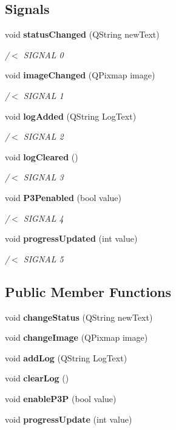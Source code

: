 \subsection*{Signals}
\begin{DoxyCompactItemize}
\item 
void \textbf{ status\+Changed} (Q\+String new\+Text)
\begin{DoxyCompactList}\small\item\em /$<$ S\+I\+G\+N\+AL 0 \end{DoxyCompactList}\item 
void \textbf{ image\+Changed} (Q\+Pixmap image)
\begin{DoxyCompactList}\small\item\em /$<$ S\+I\+G\+N\+AL 1 \end{DoxyCompactList}\item 
void \textbf{ log\+Added} (Q\+String Log\+Text)
\begin{DoxyCompactList}\small\item\em /$<$ S\+I\+G\+N\+AL 2 \end{DoxyCompactList}\item 
void \textbf{ log\+Cleared} ()
\begin{DoxyCompactList}\small\item\em /$<$ S\+I\+G\+N\+AL 3 \end{DoxyCompactList}\item 
void \textbf{ P3\+Penabled} (bool value)
\begin{DoxyCompactList}\small\item\em /$<$ S\+I\+G\+N\+AL 4 \end{DoxyCompactList}\item 
void \textbf{ progress\+Updated} (int value)
\begin{DoxyCompactList}\small\item\em /$<$ S\+I\+G\+N\+AL 5 \end{DoxyCompactList}\end{DoxyCompactItemize}
\subsection*{Public Member Functions}
\begin{DoxyCompactItemize}
\item 
void \textbf{ change\+Status} (Q\+String new\+Text)
\item 
void \textbf{ change\+Image} (Q\+Pixmap image)
\item 
void \textbf{ add\+Log} (Q\+String Log\+Text)
\item 
void \textbf{ clear\+Log} ()
\item 
void \textbf{ enable\+P3P} (bool value)
\item 
void \textbf{ progress\+Update} (int value)
\end{DoxyCompactItemize}


